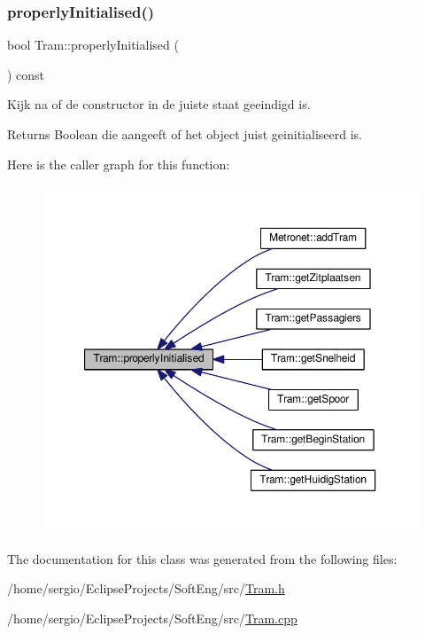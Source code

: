 \subsubsection{\texorpdfstring{properly\+Initialised()}{properlyInitialised()}}
{\footnotesize\ttfamily bool Tram\+::properly\+Initialised (\begin{DoxyParamCaption}{ }\end{DoxyParamCaption}) const}



Kijk na of de constructor in de juiste staat geeindigd is. 

\begin{DoxyReturn}{Returns}
Boolean die aangeeft of het object juist geinitialiseerd is. 
\end{DoxyReturn}
Here is the caller graph for this function\+:\nopagebreak
\begin{figure}[H]
\begin{center}
\leavevmode
\includegraphics[width=350pt]{class_tram_ac2688f590e4db232b4f535c9bf959efb_icgraph}
\end{center}
\end{figure}


The documentation for this class was generated from the following files\+:\begin{DoxyCompactItemize}
\item 
/home/sergio/\+Eclipse\+Projects/\+Soft\+Eng/src/\hyperlink{_tram_8h}{Tram.\+h}\item 
/home/sergio/\+Eclipse\+Projects/\+Soft\+Eng/src/\hyperlink{_tram_8cpp}{Tram.\+cpp}\end{DoxyCompactItemize}
